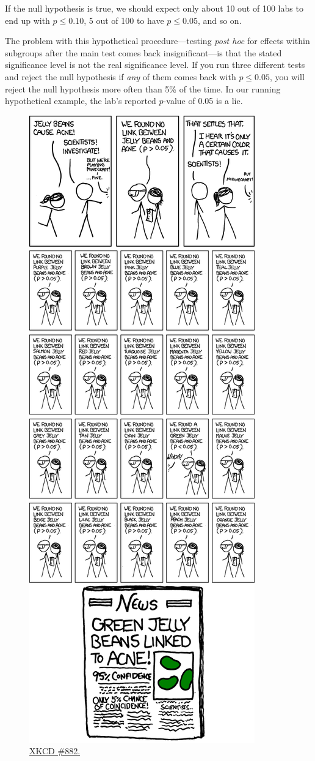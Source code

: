 \documentclass[12pt,oneside,openany]{book}
\begin{document}
If the null hypothesis is true, we should expect only about 10 out of
100 labs to end up with \(p \leq 0.10\), 5 out of 100 to have
\(p \leq 0.05\), and so on.

The problem with this hypothetical procedure---testing \emph{post hoc}
for effects within subgroups after the main test comes back
insignificant---is that the stated significance level is not the real
significance level. If you run three different tests and reject the null
hypothesis if \emph{any} of them comes back with \(p \leq 0.05\), you
will reject the null hypothesis more often than 5\% of the time. In our
running hypothetical example, the lab's reported \(p\)-value of 0.05 is
a lie.

\begin{figure}[htbp]
\centering
\includegraphics{significant.png}
\caption{\href{https://xkcd.com/882/}{XKCD \#882.}}
\end{figure}
\end{document}
